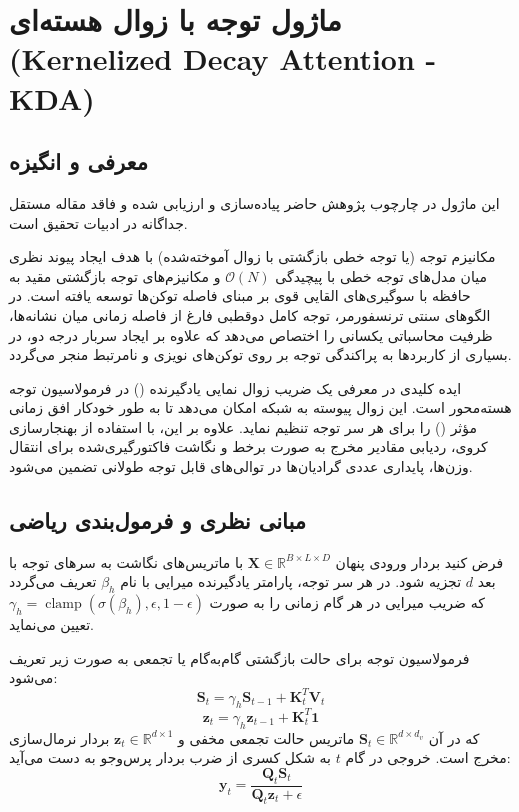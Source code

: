 \section{ماژول توجه با زوال هسته‌ای (Kernelized Decay Attention - KDA)}
\label{sec:module_kda_attention}

\subsection{معرفی و انگیزه}
این ماژول در چارچوب پژوهش حاضر پیاده‌سازی و ارزیابی شده و فاقد مقاله مستقل جداگانه در ادبیات تحقیق است.

مکانیزم توجه  (یا توجه خطی بازگشتی با زوال آموخته‌شده) با هدف ایجاد پیوند نظری میان مدل‌های توجه خطی با پیچیدگی $\mathcal{O}(N)$ و مکانیزم‌های توجه بازگشتی مقید به حافظه با سوگیری‌های القایی قوی بر مبنای فاصله توکن‌ها توسعه یافته است. در الگوهای سنتی ترنسفورمر، توجه کامل دوقطبی فارغ از فاصله زمانی میان نشانه‌ها، ظرفیت محاسباتی یکسانی را اختصاص می‌دهد که علاوه بر ایجاد سربار درجه دو، در بسیاری از کاربردها به پراکندگی توجه بر روی توکن‌های نویزی و نامرتبط منجر می‌گردد.

ایده کلیدی در  معرفی یک ضریب زوال نمایی یادگیرنده () در فرمولاسیون توجه هسته‌محور است. این زوال پیوسته به شبکه امکان می‌دهد تا به طور خودکار افق زمانی مؤثر () را برای هر سر توجه تنظیم نماید. علاوه بر این، با استفاده از بهنجارسازی کروی، ردیابی مقادیر مخرج به صورت برخط و نگاشت فاکتورگیری‌شده  برای انتقال وزن‌ها، پایداری عددی گرادیان‌ها در توالی‌های قابل توجه طولانی تضمین می‌شود.

\subsection{مبانی نظری و فرمول‌بندی ریاضی}
فرض کنید بردار ورودی پنهان $\mathbf{X} \in \mathbb{R}^{B \times L \times D}$ با ماتریس‌های نگاشت به سرهای توجه با بعد $d$ تجزیه شود. در هر سر توجه، پارامتر یادگیرنده میرایی با نام $\beta_h$ تعریف می‌گردد که ضریب میرایی در هر گام زمانی را به صورت $\gamma_h = \operatorname{clamp}(\sigma(\beta_h), \epsilon, 1 - \epsilon)$ تعیین می‌نماید.

فرمولاسیون توجه برای حالت بازگشتی گام‌به‌گام یا تجمعی به صورت زیر تعریف می‌شود:
\begin{equation}
\mathbf{S}_t = \gamma_h \mathbf{S}_{t-1} + \mathbf{K}_t^T \mathbf{V}_t
\end{equation}
\begin{equation}
\mathbf{z}_t = \gamma_h \mathbf{z}_{t-1} + \mathbf{K}_t^T \mathbf{1}
\end{equation}
که در آن $\mathbf{S}_t \in \mathbb{R}^{d \times d_v}$ ماتریس حالت تجمعی مخفی و $\mathbf{z}_t \in \mathbb{R}^{d \times 1}$ بردار نرمال‌سازی مخرج است. خروجی در گام $t$ به شکل کسری از ضرب بردار پرس‌وجو به دست می‌آید:
\begin{equation}
\mathbf{y}_t = \frac{\mathbf{Q}_t \mathbf{S}_t}{\mathbf{Q}_t \mathbf{z}_t + \epsilon}
\end{equation}


